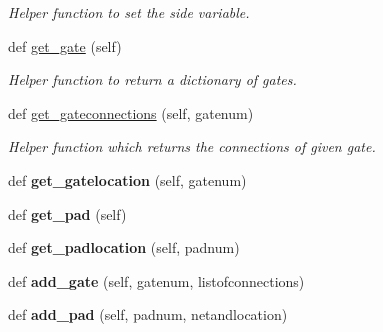 \begin{DoxyCompactItemize}
\begin{DoxyCompactList}\small\item\em Helper function to set the side variable. \end{DoxyCompactList}\item 
def \hyperlink{classgqp__placer_1_1mothercore_a9d4ec1ac49ac17f5d4ce7c4c743cbc96}{get\+\_\+gate} (self)\hypertarget{classgqp__placer_1_1mothercore_a9d4ec1ac49ac17f5d4ce7c4c743cbc96}{}\label{classgqp__placer_1_1mothercore_a9d4ec1ac49ac17f5d4ce7c4c743cbc96}

\begin{DoxyCompactList}\small\item\em Helper function to return a dictionary of gates. \end{DoxyCompactList}\item 
def \hyperlink{classgqp__placer_1_1mothercore_a396e123fe8d6cbad16f828dd21c56132}{get\+\_\+gateconnections} (self, gatenum)\hypertarget{classgqp__placer_1_1mothercore_a396e123fe8d6cbad16f828dd21c56132}{}\label{classgqp__placer_1_1mothercore_a396e123fe8d6cbad16f828dd21c56132}

\begin{DoxyCompactList}\small\item\em Helper function which returns the connections of given gate. \end{DoxyCompactList}\item 
def {\bfseries get\+\_\+gatelocation} (self, gatenum)\hypertarget{classgqp__placer_1_1mothercore_a5fc0b24a700a395afd65bb703f887e41}{}\label{classgqp__placer_1_1mothercore_a5fc0b24a700a395afd65bb703f887e41}

\item 
def {\bfseries get\+\_\+pad} (self)\hypertarget{classgqp__placer_1_1mothercore_a4729070c9a33e5e87a0c2cae03775e67}{}\label{classgqp__placer_1_1mothercore_a4729070c9a33e5e87a0c2cae03775e67}

\item 
def {\bfseries get\+\_\+padlocation} (self, padnum)\hypertarget{classgqp__placer_1_1mothercore_ad3d0a4a7e7c542864c4ba2adcfd7280a}{}\label{classgqp__placer_1_1mothercore_ad3d0a4a7e7c542864c4ba2adcfd7280a}

\item 
def {\bfseries add\+\_\+gate} (self, gatenum, listofconnections)\hypertarget{classgqp__placer_1_1mothercore_a179455b7cde50fb0c8ff3dd35be55ca1}{}\label{classgqp__placer_1_1mothercore_a179455b7cde50fb0c8ff3dd35be55ca1}

\item 
def {\bfseries add\+\_\+pad} (self, padnum, netandlocation)\hypertarget{classgqp__placer_1_1mothercore_aa4899f06601a4a1e19b3e5bce4f99bfc}{}\label{classgqp__placer_1_1mothercore_aa4899f06601a4a1e19b3e5bce4f99bfc}


\end{DoxyCompactItemize}
